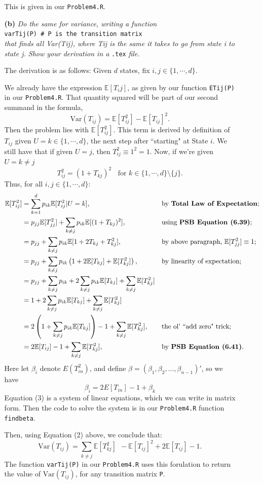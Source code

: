 \documentclass [10pt] {article}
\newcommand{\Var}{\mathrm{Var}}
\newcommand{\E}{\mathbb{E}}
\begin{document}
\begin{enumerate}
\begin{enumerate}
This is given in our \texttt{Problem4.R}.
\item[{\bf(b)}]{\it Do the same for variance, writing a function}\\
\texttt{varTij(P)  \# P is the transition matrix}\\
{\it that finds all Var(Tij), where Tij is the same it takes to go from state i to state j. Show your derivation in a} \texttt{.tex} {\it file.}

The derivation is as follows: Given $d$ states, fix $i,j\in\{1,\cdots,d\}$.

We already have the expression $\E[T_ij]$, as given by our function \texttt{ETij(P)} in our \texttt{Problem4.R}. That quantity squared will be part of our second summand in the formula, \begin{equation}\Var(T_{ij})=\E[T_{ij}^2]-\E[T_{ij}]^2.\end{equation}
Then the problem lies with $\E[T_{ij}^2]$. This term is derived by definition of $T_{ij}$ given $U=k\in\{1,\cdots,d\}$, the next step after ``starting" at State $i$. We still have that if given $U=j$, then $T_{ij}^2\equiv1^2=1$. Now, if we're given $U=k\ne j$
$$T_{ij}^2=(1+T_{kj})^2 \ \ \ \ \text{for }k\in\{1,\cdots,d\}\setminus\{j\}.$$
Thus, for all $i,j\in\{1,\cdots,d\}$:
\begin{align*}
    \E[T_{ij}^2]&=\sum_{k=1}^d p_{ik}\E[T_{ij}^2|U=k],&&\text{by {\bf Total Law of Expectation};}\\
    &=p_{jj}\E[T_{jj}^2]+\sum_{k\ne j}p_{ik}\E[(1+T_{kj})^2],&&\text{using {\bf PSB Equation (6.39)};}\\
    &=p_{jj}+\sum_{k\ne j}p_{ik}\E[1+2T_{kj}+T_{kj}^2],&&\text{by above paragraph, $\E[T_{jj}^2]\equiv1$;}\\
    &=p_{jj}+\sum_{k\ne j}p_{ik}\left(1+2\E[T_{kj}]+\E[T_{kj}^2]\right),&&\text{by linearity of expectation;}\\
    &=p_{jj}+\sum_{k\ne j}p_{ik}+2\sum_{k\ne j}p_{ik}\E[T_{kj}]+\sum_{k\ne j}\E[T_{kj}^2]\\
    &=1+2\sum_{k\ne j}p_{ik}\E[T_{kj}]+\sum_{k\ne j}\E[T_{kj}^2]\\
    &=2\left(1+\sum_{k\ne j}p_{ik}\E[T_{kj}]\right)-1+\sum_{k\ne j}\E[T_{kj}^2],&&\text{the ol' ``add zero" trick;}\\
    &=2\E[T_{ij}]-1+\sum_{k\ne j}\E[T_{kj}^2],&&\text{by {\bf PSB Equation (6.41)}.}
\end{align*}
Here let $\beta_i$ denote $E(T_{in}^2)$, and define $\beta=(\beta_1, \beta_2,...,\beta_{n-1})'$, so we have
\begin{equation}
    \beta_i = 2E[T_{in}]-1+\beta_k
\end{equation}
Equation (3) is a system of linear equations, which we can write in matrix form. Then the code to solve the system is in our \texttt{Problem4.R} function \texttt{findbeta}.

Then, using Equation (2) above, we conclude that:
$$\Var(T_{ij})=\sum_{k\ne j}\E[T_{kj}^2] \ \ -\E[T_{ij}]^2+2\E[T_{ij}]-1.$$
The function \texttt{varTij(P)} in our \texttt{Problem4.R} uses this forulation to return the value of $\Var(T_{ij})$, for any transition matrix \texttt{P}.
\end{enumerate}
\end{enumerate}
\end{document}
